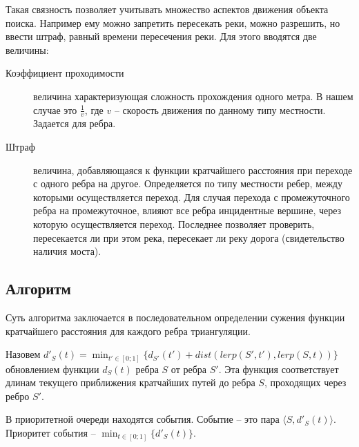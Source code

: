Такая связность позволяет учитывать множество аспектов движения
объекта поиска. Например ему можно запретить пересекать реки,
можно разрешить, но ввести штраф, равный времени пересечения реки.
Для этого вводятся две величины:
\begin{description}
\item[Коэффициент проходимости] величина характеризующая сложность прохождения
одного метра. В нашем случае это $\frac{1}{v}$, где $v$ -- скорость движения
по данному типу местности. Задается для ребра.
\item[Штраф] величина, добавляющаяся к функции кратчайшего расстояния при
переходе с одного ребра на другое. Определяется по типу местности ребер,
между которыми осуществляется переход. Для случая перехода с промежуточного
ребра на промежуточное, влияют все ребра инцидентные вершине, через которую
осуществляется переход. Последнее позволяет проверить, пересекается ли при
этом река, пересекает ли реку дорога (свидетельство наличия моста).
\end{description}


\FloatBarrier

\subsection{Алгоритм}
Суть алгоритма заключается в последовательном определении сужения функции
кратчайшего расстояния для каждого ребра триангуляции.

Назовем $\displaystyle d'_S(t) = \min_{t' \in [0; 1]}\{d_{S'}(t') + dist(lerp(S', t'), lerp(S, t))\}$
обновлением функции $d_S(t)$ ребра $S$ от ребра $S'$. Эта функция
соответствует длинам текущего приближения кратчайших путей до ребра $S$,
проходящих через ребро $S'$.

В приоритетной очереди находятся события. Событие -- это пара
$\langle S, d'_S(t) \rangle$. Приоритет события -- $\displaystyle\min_{t \in [0; 1]}\{d'_S(t)\}$.

